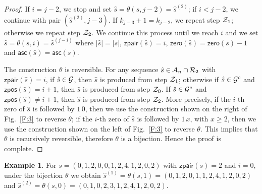 \documentclass[12pt]{amsart}
\theoremstyle{plain}
\theoremstyle{definition}
\theoremstyle{example}
\newtheorem{example}{Example}
\theoremstyle{remark}
\numberwithin{equation}{section}
\numberwithin{figure}{section}
\newcommand{\asc}{\mathsf{asc}}
\def\zero{\mathsf{zero}}
\def\A{\mathcal{A}}
\begin{document}
\begin{proof}
If $i=j-2$, we stop and set $\hat{s}=\theta(s,j-2)=\hat{s}^{(2)}$; if $i<j-2$, we continue with pair $(\hat{s}^{(2)},j-3)$. If $k_{j-3}+1=k_{j-2}$, we repeat step $\CMcal{Z}_1$; otherwise we repeat step $\CMcal{Z}_2$. We continue this process until we reach $i$ and we set $\hat{s}=\theta(s,i)=\hat{s}^{(j-i)}$ where $|\hat{s}|=|s|$, $\mathsf{zpair}(\hat{s})=i$, $\zero(\hat{s})=\zero(s)-1$ and $\asc(\hat{s})=\asc(s)$.

The construction $\theta$ is reversible. For any sequence $\hat{s}\in\A_n\cap\CMcal{R}_2$ with $\mathsf{zpair}(\hat{s})=i$, if $\hat{s}\in\CMcal{G}$, then $\hat{s}$ is produced from step $\CMcal{Z}_1$; otherwise if $\hat{s}\in \CMcal{G}^c$ and $\mathsf{zpos}(\hat{s})=i+1$, then $\hat{s}$ is produced from step $\CMcal{Z}_0$. If $\hat{s}\in \CMcal{G}^c$ and $\mathsf{zpos}(\hat{s})\ne i+1$, then $\hat{s}$ is produced from step $\CMcal{Z}_2$.  More precisely, if the $i$-th zero of $\hat{s}$ is followed by $1\,0$, then we use the construction shown on the right of Fig.~\ref{F:3} to reverse $\theta$; if the $i$-th zero of $\hat{s}$ is followed by $1\,x$, with $x\ge 2$, then we use the construction shown on the left of Fig.~\ref{F:3} to reverse $\theta$. This implies that $\theta$ is recursively reversible, therefore $\theta$ is a bijection. Hence the proof is complete.
\end{proof}

\begin{example}
For $s=(0,1,2,0,0,1,2,4,1,2,0,2)$ with $\mathsf{zpair}(s)=2$ and $i=0$, under the bijection $\theta$ we obtain $\hat{s}^{(1)}=\theta(s,1)=(0,1,2,0,1,1,2,4,1,2,0,2)$ and
$\hat{s}^{(2)}=\theta(s,0)=(0,1,0,2,3,1,2,4,1,2,0,2)$.
\end{example}
\end{document}
